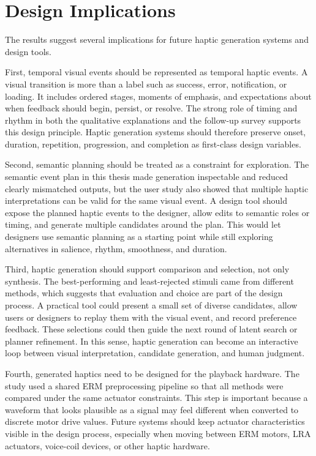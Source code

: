 \section{Design Implications}

The results suggest several implications for future haptic generation systems and design tools.

First, temporal visual events should be represented as temporal haptic events. A visual transition is more than a label such as success, error, notification, or loading. It includes ordered stages, moments of emphasis, and expectations about when feedback should begin, persist, or resolve. The strong role of timing and rhythm in both the qualitative explanations and the follow-up survey supports this design principle. Haptic generation systems should therefore preserve onset, duration, repetition, progression, and completion as first-class design variables.

Second, semantic planning should be treated as a constraint for exploration. The semantic event plan in this thesis made generation inspectable and reduced clearly mismatched outputs, but the user study also showed that multiple haptic interpretations can be valid for the same visual event. A design tool should expose the planned haptic events to the designer, allow edits to semantic roles or timing, and generate multiple candidates around the plan. This would let designers use semantic planning as a starting point while still exploring alternatives in salience, rhythm, smoothness, and duration.

Third, haptic generation should support comparison and selection, not only synthesis. The best-performing and least-rejected stimuli came from different methods, which suggests that evaluation and choice are part of the design process. A practical tool could present a small set of diverse candidates, allow users or designers to replay them with the visual event, and record preference feedback. These selections could then guide the next round of latent search or planner refinement. In this sense, haptic generation can become an interactive loop between visual interpretation, candidate generation, and human judgment.

Fourth, generated haptics need to be designed for the playback hardware. The study used a shared ERM preprocessing pipeline so that all methods were compared under the same actuator constraints. This step is important because a waveform that looks plausible as a signal may feel different when converted to discrete motor drive values. Future systems should keep actuator characteristics visible in the design process, especially when moving between ERM motors, LRA actuators, voice-coil devices, or other haptic hardware.

